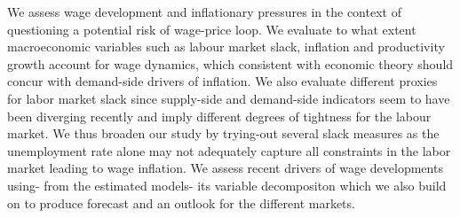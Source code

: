 We assess wage development and inflationary pressures in the context of questioning a potential risk of wage-price loop. We evaluate to what extent macroeconomic variables such as labour market slack, inflation and productivity growth account for wage dynamics, which consistent with economic theory should concur with demand-side drivers of inflation. We also evaluate different proxies for labor market slack since supply-side and demand-side indicators seem to have been diverging recently and imply different degrees of tightness for the labour market. We thus broaden our study by trying-out several slack measures as the unemployment rate alone may not adequately capture all constraints in the labor market leading to wage inflation. We assess recent drivers of wage developments using- from the estimated models- its variable decompositon which we also build on to produce forecast and an outlook for the different markets.